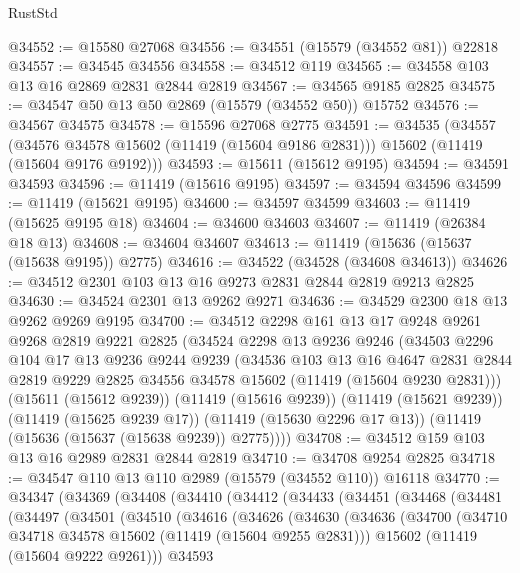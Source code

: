 \begin{lexlean}{RustStd}
\begin{coremodule}
@34552 := @15580 @27068
@34556 := @34551 (@15579 (@34552 @81)) @22818
@34557 := @34545 @34556
@34558 := @34512 @119
@34565 := @34558 @103 @13 @16 @2869 @2831 @2844 @2819
@34567 := @34565 @9185 @2825
@34575 := @34547 @50 @13 @50 @2869 (@15579 (@34552 @50)) @15752
@34576 := @34567 @34575
@34578 := @15596 @27068 @2775
@34591 := @34535
    (@34557
      (@34576 @34578 @15602 (@11419 (@15604 @9186 @2831)))
      @15602
      (@11419 (@15604 @9176 @9192)))
@34593 := @15611 (@15612 @9195)
@34594 := @34591 @34593
@34596 := @11419 (@15616 @9195)
@34597 := @34594 @34596
@34599 := @11419 (@15621 @9195)
@34600 := @34597 @34599
@34603 := @11419 (@15625 @9195 @18)
@34604 := @34600 @34603
@34607 := @11419 (@26384 @18 @13)
@34608 := @34604 @34607
@34613 := @11419 (@15636 (@15637 (@15638 @9195)) @2775)
@34616 := @34522 (@34528 (@34608 @34613))
@34626 := @34512 @2301 @103 @13 @16 @9273 @2831 @2844 @2819 @9213 @2825
@34630 := @34524 @2301 @13 @9262 @9271
@34636 := @34529 @2300 @18 @13 @9262 @9269 @9195
@34700 := @34512
    @2298
    @161
    @13
    @17
    @9248
    @9261
    @9268
    @2819
    @9221
    @2825
    (@34524
      @2298
      @13
      @9236
      @9246
      (@34503
        @2296
        @104
        @17
        @13
        @9236
        @9244
        @9239
        (@34536
          @103
          @13
          @16
          @4647
          @2831
          @2844
          @2819
          @9229
          @2825
          @34556
          @34578
          @15602
          (@11419 (@15604 @9230 @2831)))
        (@15611 (@15612 @9239))
        (@11419 (@15616 @9239))
        (@11419 (@15621 @9239))
        (@11419 (@15625 @9239 @17))
        (@11419 (@15630 @2296 @17 @13))
        (@11419 (@15636 (@15637 (@15638 @9239)) @2775))))
@34708 := @34512 @159 @103 @13 @16 @2989 @2831 @2844 @2819
@34710 := @34708 @9254 @2825
@34718 := @34547 @110 @13 @110 @2989 (@15579 (@34552 @110)) @16118
@34770 := @34347
    (@34369
      (@34408
        (@34410
          (@34412
            (@34433
              (@34451
                (@34468
                  (@34481
                    (@34497
                      (@34501
                        (@34510
                          (@34616
                            (@34626
                              (@34630
                                (@34636
                                  (@34700
                                    (@34710 @34718 @34578 @15602 (@11419 (@15604 @9255 @2831)))
                                    @15602
                                    (@11419 (@15604 @9222 @9261)))
                                  @34593

\end{coremodule}
\end{lexlean}
